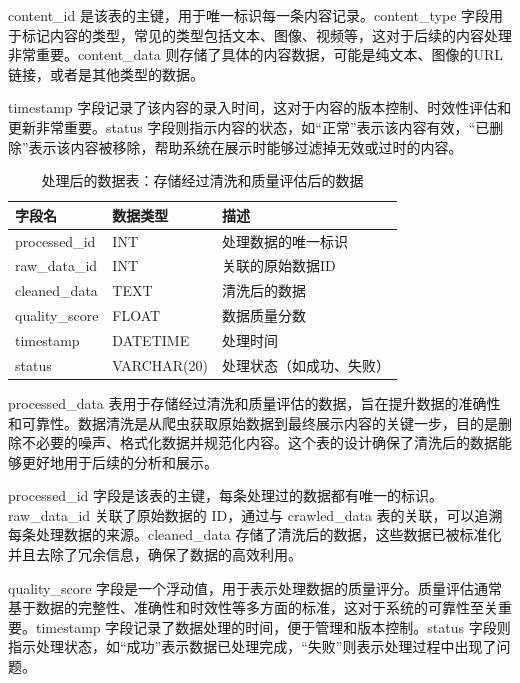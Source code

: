 content\_id 是该表的主键，用于唯一标识每一条内容记录。content\_type 字段用于标记内容的类型，常见的类型包括文本、图像、视频等，这对于后续的内容处理非常重要。content\_data 则存储了具体的内容数据，可能是纯文本、图像的URL链接，或者是其他类型的数据。

timestamp 字段记录了该内容的录入时间，这对于内容的版本控制、时效性评估和更新非常重要。status 字段则指示内容的状态，如“正常”表示该内容有效，“已删除”表示该内容被移除，帮助系统在展示时能够过滤掉无效或过时的内容。
\begin{table}[H]
\centering
\caption{处理后的数据表：存储经过清洗和质量评估后的数据}
\label{tab:processed_data}
{\renewcommand{\arraystretch}{1}
\begin{tabular}{|p{3cm}|p{3cm}|p{6cm}|}
\hline
\textbf{字段名} & \textbf{数据类型} & \textbf{描述} \\ \hline
processed\_id & INT & 处理数据的唯一标识 \\ \hline
raw\_data\_id & INT & 关联的原始数据ID \\ \hline
cleaned\_data & TEXT & 清洗后的数据 \\ \hline
quality\_score & FLOAT & 数据质量分数 \\ \hline
timestamp & DATETIME & 处理时间 \\ \hline
status & VARCHAR(20) & 处理状态（如成功、失败） \\ \hline
\end{tabular}
}
\end{table}

processed\_data 表用于存储经过清洗和质量评估的数据，旨在提升数据的准确性和可靠性。数据清洗是从爬虫获取原始数据到最终展示内容的关键一步，目的是删除不必要的噪声、格式化数据并规范化内容。这个表的设计确保了清洗后的数据能够更好地用于后续的分析和展示。

processed\_id 字段是该表的主键，每条处理过的数据都有唯一的标识。raw\_data\_id 关联了原始数据的 ID，通过与 crawled\_data 表的关联，可以追溯每条处理数据的来源。cleaned\_data 存储了清洗后的数据，这些数据已被标准化并且去除了冗余信息，确保了数据的高效利用。

quality\_score 字段是一个浮动值，用于表示处理数据的质量评分。质量评估通常基于数据的完整性、准确性和时效性等多方面的标准，这对于系统的可靠性至关重要。timestamp 字段记录了数据处理的时间，便于管理和版本控制。status 字段则指示处理状态，如“成功”表示数据已处理完成，“失败”则表示处理过程中出现了问题。

